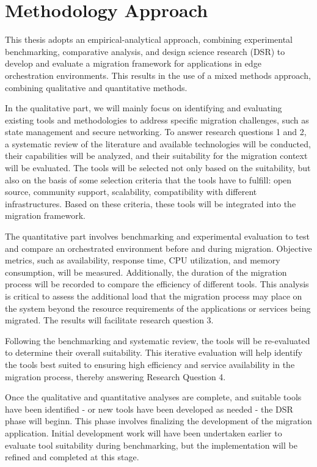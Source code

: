 %
\section{Methodology Approach}
\label{sec:methodology-approach}
%


This thesis adopts an empirical-analytical approach, combining experimental benchmarking, comparative analysis, and design science research (DSR) to develop and evaluate a migration framework for applications in edge orchestration environments. This results in the use of a mixed methods approach, combining qualitative and quantitative methods. 

In the qualitative part, we will mainly focus on identifying and evaluating existing tools and methodologies to address specific migration challenges, such as state management and secure networking. To answer research questions 1 and 2, a systematic review of the literature and available technologies will be conducted, their capabilities will be analyzed, and their suitability for the migration context will be evaluated. The tools will be selected not only based on the suitability, but also on the basis of some selection criteria that the tools have to fulfill: open source, community support, scalability, compatibility with different infrastructures. Based on these criteria, these tools will be integrated into the migration framework.

The quantitative part involves benchmarking and experimental evaluation to test and compare an orchestrated environment before and during migration. Objective metrics, such as availability, response time, CPU utilization, and memory consumption, will be measured. Additionally, the duration of the migration process will be recorded to compare the efficiency of different tools. This analysis is critical to assess the additional load that the migration process may place on the system beyond the resource requirements of the applications or services being migrated. The results will facilitate research question 3.

Following the benchmarking and systematic review, the tools will be re-evaluated to determine their overall suitability. This iterative evaluation will help identify the tools best suited to ensuring high efficiency and service availability in the migration process, thereby answering Research Question 4.

Once the qualitative and quantitative analyses are complete, and suitable tools have been identified - or new tools have been developed as needed - the DSR phase will beginn. This phase involves finalizing the development of the migration application. Initial development work will have been undertaken earlier to evaluate tool suitability during benchmarking, but the implementation will be refined and completed at this stage.